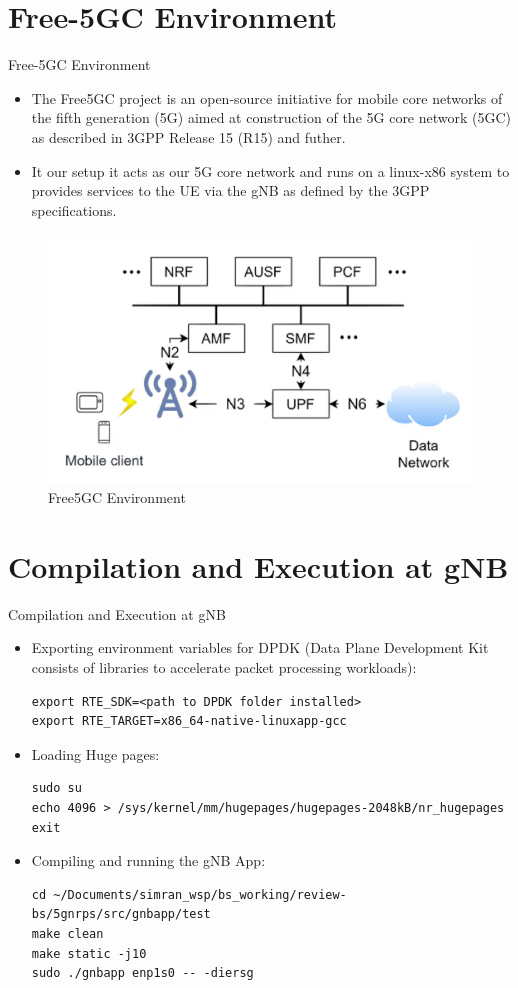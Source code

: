 \documentclass{beamer}
\begin{document}
\section{Free-5GC Environment}
\begin{frame}{Free-5GC Environment}
	\begin{itemize}
    	\item The Free5GC project is an open-source initiative for mobile core networks of the fifth generation (5G) aimed  at construction of the 5G core network (5GC) as described in 3GPP Release 15 (R15) and futher.
    	\item It our setup it acts as our 5G core network and runs on a linux-x86 system to provides services to the UE via the gNB as defined by the 3GPP specifications.
    \end{itemize}

	\begin{figure}[h!]
  		\centering
  		\includegraphics[width=0.7\linewidth]{./figs/Free5GC.png}
  		\caption{Free5GC Environment}
  		\label{Free5GC}
	\end{figure}
\end{frame} 

\section{Compilation and Execution at gNB}
\begin{frame}[fragile]{Compilation and Execution at gNB}
\begin{itemize}
    	\item Exporting environment variables for DPDK (Data Plane Development Kit consists of libraries to accelerate packet processing workloads):
\begin{lstlisting}
export RTE_SDK=<path to DPDK folder installed>
export RTE_TARGET=x86_64-native-linuxapp-gcc
\end{lstlisting}
	\item Loading Huge pages:
	\begin{lstlisting}
sudo su
echo 4096 > /sys/kernel/mm/hugepages/hugepages-2048kB/nr_hugepages
exit
\end{lstlisting}
\item Compiling and running the gNB App:
\begin{lstlisting}
cd ~/Documents/simran_wsp/bs_working/review-bs/5gnrps/src/gnbapp/test
make clean
make static -j10
sudo ./gnbapp enp1s0 -- -diersg
\end{lstlisting}
\end{itemize}
\end{frame}
\end{document}
